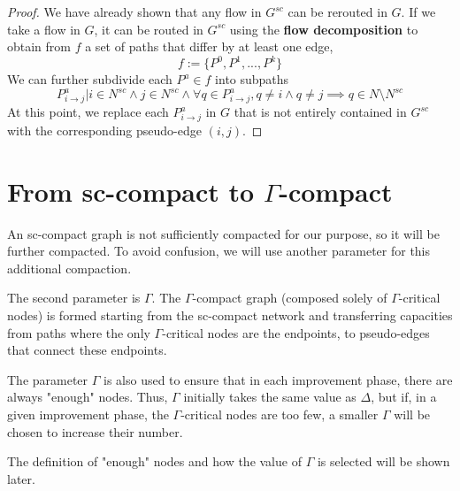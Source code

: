     \begin{proof}
        We have already shown that any flow in \(G^{sc}\) can be rerouted in \(G\).
        If we take a flow in \(G\), it can be routed in \(G^{sc}\) using the \textbf{flow decomposition} to obtain from \(f\) a set of paths that differ by at least one edge,
        \[f := \{P^0, P^1, ..., P^k\}\]
        We can further subdivide each \(P^a\in f\) into subpaths \[P^{a}_{i\rightarrow j}| i\in N^{sc}\land j\in N^{sc}\land \forall q \in P^a_{i\rightarrow j}, q\not = i \land q\not = j \implies q\in N\setminus N^{sc}\] 
        At this point, we replace each \(P^{a}_{i\rightarrow j}\) in \(G\) that is not entirely contained in \(G^{sc}\) with the corresponding pseudo-edge \((i,j)\).

    \end{proof}

\section{From sc-compact to $\Gamma$-compact}
An sc-compact graph is not sufficiently compacted for our purpose, so it will be further compacted. To avoid confusion, we will use another parameter for this additional compaction.

The second parameter is \(\Gamma\).  
The \(\Gamma\)-compact graph (composed solely of \(\Gamma\)-critical nodes) is formed starting from the sc-compact network and transferring capacities from paths where the only \(\Gamma\)-critical nodes are the endpoints, to pseudo-edges that connect these endpoints.

The parameter \(\Gamma\) is also used to ensure that in each improvement phase, there are always "enough" nodes. Thus, \(\Gamma\) initially takes the same value as \(\Delta\), but if, in a given improvement phase, the \(\Gamma\)-critical nodes are too few, a smaller \(\Gamma\) will be chosen to increase their number.

The definition of "enough" nodes and how the value of \(\Gamma\) is selected will be shown later.

